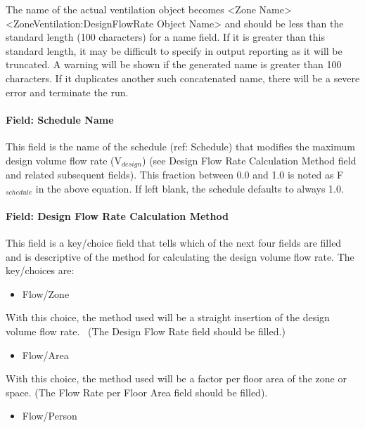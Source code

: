 The name of the actual ventilation object becomes \textless{}Zone Name\textgreater{} \textless{}ZoneVentilation:DesignFlowRate Object Name\textgreater{} and should be less than the standard length (100 characters) for a name field. If it is greater than this standard length, it may be difficult to specify in output reporting as it will be truncated. A warning will be shown if the generated name is greater than 100 characters. If it duplicates another such concatenated name, there will be a severe error and terminate the run.

\paragraph{Field: Schedule Name}\label{field-schedule-name-2016-06-16}

This field is the name of the schedule (ref: Schedule) that modifies the maximum design volume flow rate (V\(_{design}\)) (see Design Flow Rate Calculation Method field and related subsequent fields). This fraction between 0.0 and 1.0 is noted as F\(_{schedule}\) in the above equation. If left blank, the schedule defaults to always 1.0.

\paragraph{Field: Design Flow Rate Calculation Method}\label{field-design-flow-rate-calculation-method-1}

This field is a key/choice field that tells which of the next four fields are filled and is descriptive of the method for calculating the design volume flow rate. The key/choices are:

\begin{itemize}
\tightlist
\item
  Flow/Zone
\end{itemize}

With this choice, the method used will be a straight insertion of the design volume flow rate.~ (The Design Flow Rate field should be filled.)

\begin{itemize}
\tightlist
\item
  Flow/Area
\end{itemize}

With this choice, the method used will be a factor per floor area of the zone or space. (The Flow Rate per Floor Area field should be filled).

\begin{itemize}
\tightlist
\item
  Flow/Person
\end{itemize}

